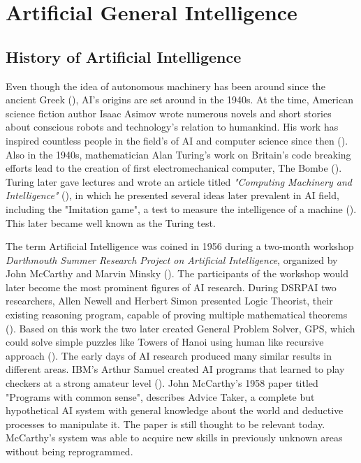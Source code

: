 \documentclass[utf8,english]{gradu3}
\begin{document}
\chapter{Artificial General Intelligence} 

\section{History of Artificial Intelligence} 
% 
Even though the idea of autonomous machinery has been around since the ancient Greek (\cite{}), AI's origins are set around in the 1940s. At the time, American science fiction author Isaac Asimov wrote numerous novels and short stories about conscious robots and technology's relation to humankind. His work has inspired countless people in the field's of AI and computer science since then (\cite{kaplan2019}).
Also in the 1940s, mathematician Alan Turing's work on Britain's code breaking efforts lead to the creation of first electromechanical computer, The Bombe (\cite{kaplan2019}). Turing later gave lectures and wrote an article titled \emph{"Computing Machinery and Intelligence"} (\cite*{turing1950}), in which he presented several ideas later prevalent in AI field, including the "Imitation game", a test to measure the intelligence of a machine (\cite{norvig2002}). This later became well known as the Turing test.

The term Artificial Intelligence was coined in 1956 during a two-month workshop \emph{Darthmouth Summer Research Project on Artificial Intelligence}, organized by John McCarthy and Marvin Minsky (\cite{kaplan2019}). The participants of the workshop would later become the most prominent figures of AI research. During DSRPAI two researchers, Allen Newell and Herbert Simon presented Logic Theorist, their existing reasoning program, capable of proving multiple mathematical theorems (\cite{norvig2002}). Based on this work the two later created General Problem Solver, GPS, which could solve simple puzzles like Towers of Hanoi using human like recursive approach (\cite{newell1959}). The early days of AI research produced many similar results in different areas. IBM's Arthur Samuel created AI programs that learned to play checkers at a strong amateur level (\cite{norvig2002}).
John McCarthy's 1958 paper titled "Programs with common sense", describes Advice Taker, a complete but hypothetical AI system with general knowledge about the world and deductive processes to manipulate it. The paper is still thought to be relevant today. McCarthy's system was able to acquire new skills in previously unknown areas without being reprogrammed.
\end{document}
